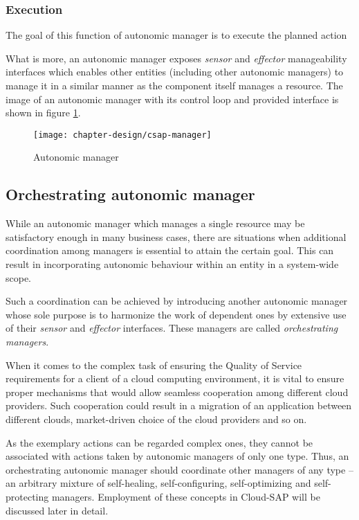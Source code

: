 \subsubsection{Execution}
The goal of this function of autonomic manager is to execute the planned action

  
What is more, an autonomic manager exposes \emph{sensor} and \emph{effector} manageability interfaces which enables other entities (including other autonomic managers) to manage it in a similar manner as the component itself manages a resource. The image of an autonomic manager with its control loop and provided interface is shown in figure \ref{img:csap-manager}.

\begin{figure}[!ht]
  \begin{center}
    \texttt{[image: chapter-design/csap-manager]}
  \end{center}
  \caption{Autonomic manager}
  \label{img:csap-manager}
\end{figure}

\subsection{Orchestrating autonomic manager}
While an autonomic manager which manages a single resource may be satisfactory enough in many business cases, there are situations when additional coordination among managers is essential to attain the certain goal. This can result in incorporating autonomic behaviour within an entity in a system-wide scope.

Such a coordination can be achieved by introducing another autonomic manager whose sole purpose is to harmonize the work of dependent ones by extensive use of their \emph{sensor} and \emph{effector} interfaces. These managers are called \emph{orchestrating managers}.

When it comes to the complex task of ensuring the Quality of Service requirements for a client of a cloud computing environment, it is vital to ensure proper mechanisms that would allow seamless cooperation among different cloud providers. Such cooperation could result in a migration of an application between different clouds, market-driven choice of the cloud providers and so on.

As the exemplary actions can be regarded complex ones, they cannot be associated with actions taken by autonomic managers of only one type. Thus, an orchestrating autonomic manager should coordinate other managers of any type -- an arbitrary mixture of self-healing, self-configuring, self-optimizing and self-protecting managers. Employment of these concepts in Cloud-SAP will be discussed later in detail.

